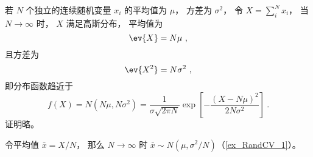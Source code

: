
\begin{issues}
\issueDraft
\end{issues}


若 $N$ 个独立的连续随机变量 $x_i$ 的平均值为 $\mu$， 方差为 $\sigma^2$， 令 $X = \sum_i^N x_i$， 当 $N \to \infty$ 时， $X$ 满足高斯分布， 平均值为
\begin{equation}
\ev{X} = N\mu~,
\end{equation}
且方差为
\begin{equation}
\ev{X^2} = N\sigma^2~,
\end{equation}
即分布函数趋近于
\begin{equation}
f(X) = N(N\mu, N\sigma^2) = \frac{1}{\sigma\sqrt{2\pi N}} \exp[-\frac{(X-N\mu)^2}{2N\sigma^2}]~.
\end{equation}
证明略。

令平均值 $\bar x = X/N$， 那么 $N\to\infty$ 时 $\bar x\sim N(\mu, \sigma^2/N)$（\autoref{ex_RandCV_1}）。
